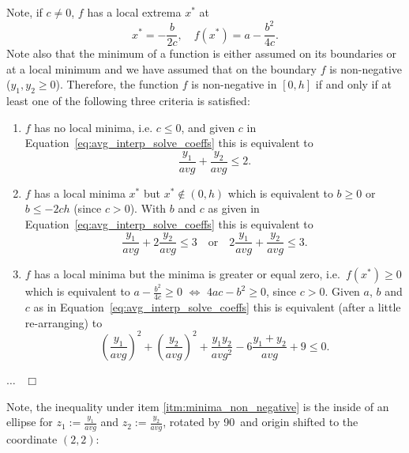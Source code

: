 \documentclass[11pt]{article}
\newcommand{\avg}{\textit{avg}}
\newcommand{\equivalent}{\Leftrightarrow}
\theoremstyle{break}            %
\newenvironment{proof}{\par\noindent{\bf Proof~}
  \ignorespaces}{\hspace*{\fill}~$\Box$\par\medskip}
\begin{document}
\begin{proof}
Note, if $c\neq 0$, $f$ has a local extrema $x^*$ at
\begin{equation*}
    x^*  =-\frac{b}{2c}, \quad f(x^*)  =a-\frac{b^2}{4c}.
\end{equation*}
Note also that the minimum of a function is either assumed on
its boundaries or at a local minimum and we have assumed that on
the boundary $f$ is non-negative ($y_1,y_2\geq 0$). Therefore,
the function $f$ is non-negative in $[0,h]$ if and only if
at least one of the following three criteria is satisfied:
\begin{enumerate}
  \item $f$ has no local minima, i.e. $c\leq 0$, and given
      $c$ in Equation~\eqref{eq:avg_interp_solve_coeffs} this is equivalent
      to
      \begin{equation*}
          \frac{y_1}{\avg} + \frac{y_2}{\avg} \leq 2.
      \end{equation*}
  \item $f$ has a local minima $x^*$ but $x^*\not\in (0,h)$
      which is equivalent to $b\geq 0$ or $b\leq -2ch$
      (since $c>0$). With $b$ and $c$ as given in
      Equation~\eqref{eq:avg_interp_solve_coeffs}
      this is equivalent to
      \begin{equation*}
          \frac{y_1}{\avg} + 2 \frac{y_2}{\avg} \leq 3 \quad \text{or} \quad
          2 \frac{y_1}{\avg} + \frac{y_2}{\avg} \leq 3.
      \end{equation*}
  \item \label{itm:minima_non_negative}
      $f$ has a local minima but the minima is greater or equal zero,
      i.e.\ $f(x^*)\geq 0$ which is equivalent to $a-\frac{b^2}{4c}\geq 0$
      $\equivalent$ $4ac - b^2 \geq 0$, since $c>0$.
      Given $a$, $b$ and $c$ as in Equation~\eqref{eq:avg_interp_solve_coeffs}
      this is equivalent (after a little re-arranging) to
      \begin{equation*}
        \left(\frac{y_1}{\avg}\right)^2 +
        \left(\frac{y_2}{\avg}\right)^2 +
        \frac{y_1 y_2}{\avg^2}- 6 \frac{y_1+y_2}{\avg} + 9 \leq 0.
      \end{equation*}
\end{enumerate}
$\dots$
\end{proof}
Note, the inequality under item
\ref{itm:minima_non_negative} is the inside
of an ellipse for $z_1:=\frac{y_1}{\avg}$ and $z_2:=\frac{y_2}{\avg}$,
rotated by 90\textdegree\ and origin shifted to the coordinate $(2,2)$:
\end{document}

